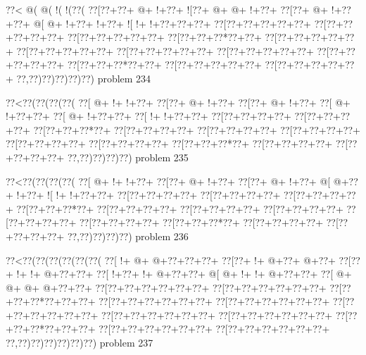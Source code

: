 \vbox{\vbox{\goo
\0??<\- @(\- @(\- !(\- !(\0??(
\0??[\0??+\0??+\- @+\- !+\0??+
\- ![\0??+\- @+\- @+\- !+\0??+
\0??[\0??+\- @+\- !+\0??+\0??+
\- @[\- @+\- !+\0??+\- !+\0??+
\- ![\- !+\- !+\0??+\0??+\0??+
\0??[\0??+\0??+\0??+\0??+\0??+
\0??[\0??+\0??+\0??+\0??+\0??+
\0??[\0??+\0??+\0??+\0??+\0??+
\0??[\0??+\0??+\0??*\0??+\0??+
\0??[\0??+\0??+\0??+\0??+\0??+
\0??[\0??+\0??+\0??+\0??+\0??+
\0??[\0??+\0??+\0??+\0??+\0??+
\0??[\0??+\0??+\0??+\0??+\0??+
\0??[\0??+\0??+\0??+\0??+\0??+
\0??[\0??+\0??+\0??*\0??+\0??+
\0??[\0??+\0??+\0??+\0??+\0??+
\0??[\0??+\0??+\0??+\0??+\0??+
\0??,\0??)\0??)\0??)\0??)\0??)
}
\hfil problem 234\hfil\break
}

\vbox{\vbox{\goo
\0??<\0??(\0??(\0??(\0??(
\0??[\- @+\- !+\- !+\0??+
\0??[\0??+\- @+\- !+\0??+
\0??[\0??+\- @+\- !+\0??+
\0??[\- @+\- !+\0??+\0??+
\0??[\- @+\- !+\0??+\0??+
\0??[\- !+\- !+\0??+\0??+
\0??[\0??+\0??+\0??+\0??+
\0??[\0??+\0??+\0??+\0??+
\0??[\0??+\0??+\0??*\0??+
\0??[\0??+\0??+\0??+\0??+
\0??[\0??+\0??+\0??+\0??+
\0??[\0??+\0??+\0??+\0??+
\0??[\0??+\0??+\0??+\0??+
\0??[\0??+\0??+\0??+\0??+
\0??[\0??+\0??+\0??*\0??+
\0??[\0??+\0??+\0??+\0??+
\0??[\0??+\0??+\0??+\0??+
\0??,\0??)\0??)\0??)\0??)
}
\hfil problem 235\hfil\break
}

\vbox{\vbox{\goo
\0??<\0??(\0??(\0??(\0??(
\0??[\- @+\- !+\- !+\0??+
\0??[\0??+\- @+\- !+\0??+
\0??[\0??+\- @+\- !+\0??+
\- @[\- @+\0??+\- !+\0??+
\- ![\- !+\- !+\0??+\0??+
\0??[\0??+\0??+\0??+\0??+
\0??[\0??+\0??+\0??+\0??+
\0??[\0??+\0??+\0??+\0??+
\0??[\0??+\0??+\0??*\0??+
\0??[\0??+\0??+\0??+\0??+
\0??[\0??+\0??+\0??+\0??+
\0??[\0??+\0??+\0??+\0??+
\0??[\0??+\0??+\0??+\0??+
\0??[\0??+\0??+\0??+\0??+
\0??[\0??+\0??+\0??*\0??+
\0??[\0??+\0??+\0??+\0??+
\0??[\0??+\0??+\0??+\0??+
\0??,\0??)\0??)\0??)\0??)
}
\hfil problem 236\hfil\break
}

\vbox{\vbox{\goo
\0??<\0??(\0??(\0??(\0??(\0??(\0??(
\0??[\- !+\- @+\- @+\0??+\0??+\0??+
\0??[\0??+\- !+\- @+\0??+\- @+\0??+
\0??[\0??+\- !+\- !+\- @+\0??+\0??+
\0??[\- !+\0??+\- !+\- @+\0??+\0??+
\- @[\- @+\- !+\- !+\- @+\0??+\0??+
\0??[\- @+\- @+\- @+\- @+\0??+\0??+
\0??[\0??+\0??+\0??+\0??+\0??+\0??+
\0??[\0??+\0??+\0??+\0??+\0??+\0??+
\0??[\0??+\0??+\0??*\0??+\0??+\0??+
\0??[\0??+\0??+\0??+\0??+\0??+\0??+
\0??[\0??+\0??+\0??+\0??+\0??+\0??+
\0??[\0??+\0??+\0??+\0??+\0??+\0??+
\0??[\0??+\0??+\0??+\0??+\0??+\0??+
\0??[\0??+\0??+\0??+\0??+\0??+\0??+
\0??[\0??+\0??+\0??*\0??+\0??+\0??+
\0??[\0??+\0??+\0??+\0??+\0??+\0??+
\0??[\0??+\0??+\0??+\0??+\0??+\0??+
\0??,\0??)\0??)\0??)\0??)\0??)\0??)
}
\hfil problem 237\hfil\break
}

